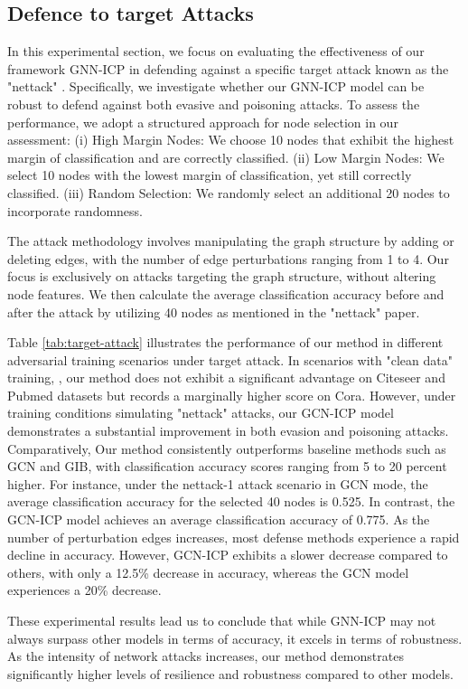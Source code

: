 \documentclass[conference]{IEEEtran}
\begin{document}
\subsection{Defence to target Attacks}
In this experimental section, we focus on evaluating the effectiveness of our framework GNN-ICP in defending against a specific target attack known as the "nettack" \cite{Zgner2018AdversarialAO}. Specifically, we investigate whether our GNN-ICP model can be robust to defend against both evasive and poisoning attacks. To assess the performance, we adopt a structured approach for node selection in our assessment:
(i) High Margin Nodes: We choose 10 nodes that exhibit the highest margin of classification and are correctly classified. (ii) Low Margin Nodes: We select 10 nodes with the lowest margin of classification, yet still correctly classified. (iii) Random Selection: We randomly select an additional 20 nodes to incorporate randomness. 

The attack methodology involves manipulating the graph structure by adding or deleting edges, with the number of edge perturbations ranging from 1 to 4. Our focus is exclusively on attacks targeting the graph structure, without altering node features. We then calculate the average classification accuracy before and after the attack by utilizing 40 nodes as mentioned in the "nettack" paper. 

Table \ref{tab:target-attack} illustrates the performance of our method in different adversarial training scenarios under target attack. In scenarios with "clean data" training, , our method does not exhibit a significant advantage on Citeseer and Pubmed datasets but records a marginally higher score on Cora. However, under training conditions simulating "nettack" attacks, our GCN-ICP model demonstrates a substantial improvement in both evasion and poisoning attacks. Comparatively, Our method consistently outperforms baseline methods such as GCN and GIB, with classification accuracy scores ranging from 5 to 20 percent higher. For instance,  under the nettack-1 attack scenario in GCN mode, the average classification accuracy for the selected 40 nodes is 0.525. In contrast, the GCN-ICP model achieves an average classification accuracy of 0.775. As the number of perturbation edges increases, most defense methods experience a rapid decline in accuracy. However, GCN-ICP exhibits a slower decrease compared to others, with only a 12.5\% decrease in accuracy, whereas the GCN model experiences a 20\% decrease. 

These experimental results lead us to conclude that while GNN-ICP may not always surpass other models in terms of accuracy, it excels in terms of robustness. As the intensity of network attacks increases, our method demonstrates significantly higher levels of resilience and robustness compared to other models.
\end{document}
